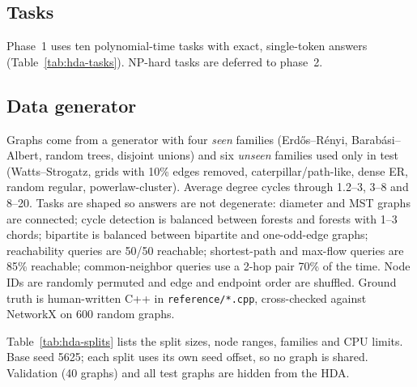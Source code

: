 \documentclass[11pt]{article}
\begin{document}
\subsection{Tasks}
Phase~1 uses ten polynomial-time tasks with exact, single-token answers
(Table~\ref{tab:hda-tasks}). NP-hard tasks are deferred to phase~2.

\begin{table}[h]
\centering
\small

\caption{Phase-1 tasks. ``Query args'' is the number of nodes after the graph;
\texttt{2} means $s$ and $t$.}
\label{tab:hda-tasks}
\end{table}

\subsection{Data generator}
Graphs come from a generator with four \emph{seen} families (Erd\H{o}s--R\'enyi,
Barab\'asi--Albert, random trees, disjoint unions) and six \emph{unseen} families
used only in test (Watts--Strogatz, grids with 10\% edges removed,
caterpillar/path-like, dense ER, random regular, powerlaw-cluster). Average
degree cycles through 1.2--3, 3--8 and 8--20. Tasks are shaped so answers are not
degenerate: diameter and MST graphs are connected; cycle detection is balanced
between forests and forests with 1--3 chords; bipartite is balanced between
bipartite and one-odd-edge graphs; reachability queries are 50/50 reachable;
shortest-path and max-flow queries are 85\% reachable; common-neighbor queries
use a 2-hop pair 70\% of the time. Node IDs are randomly permuted and edge and
endpoint order are shuffled. Ground truth is human-written C++ in
\texttt{reference/*.cpp}, cross-checked against NetworkX on 600 random graphs.

Table~\ref{tab:hda-splits} lists the split sizes, node ranges, families and CPU
limits. Base seed 5625; each split uses its own seed offset, so no graph is
shared. Validation (40 graphs) and all test graphs are hidden from the HDA.

\begin{table}[h]
\centering
\small

\caption{HDA splits. \texttt{examples} is the pool from which $k=10$ examples
per iteration are drawn.}
\label{tab:hda-splits}
\end{table}
\end{document}
